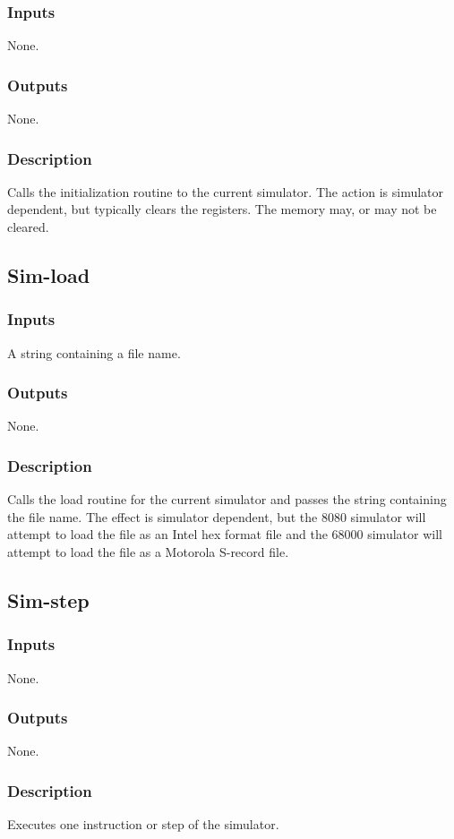 \documentclass[10pt, openany]{book}
\begin{document}
\subsubsection{Inputs}
None.
\subsubsection{Outputs}
None.
\subsubsection{Description}
Calls the initialization routine to the current simulator.  The action is simulator dependent, but typically clears the registers.  The memory may, or may not be cleared.

\subsection{Sim-load}
\subsubsection{Inputs}
A string containing a file name.
\subsubsection{Outputs}
None.
\subsubsection{Description}
Calls the load routine for the current simulator and passes the string containing the file name.  The effect is simulator dependent, but the 8080 simulator will attempt to load the file as an Intel hex format file and the 68000 simulator will attempt to load the file as a Motorola S-record file.

\subsection{Sim-step}
\subsubsection{Inputs}
None.
\subsubsection{Outputs}
None.
\subsubsection{Description}
Executes one instruction or step of the simulator.
\end{document}
